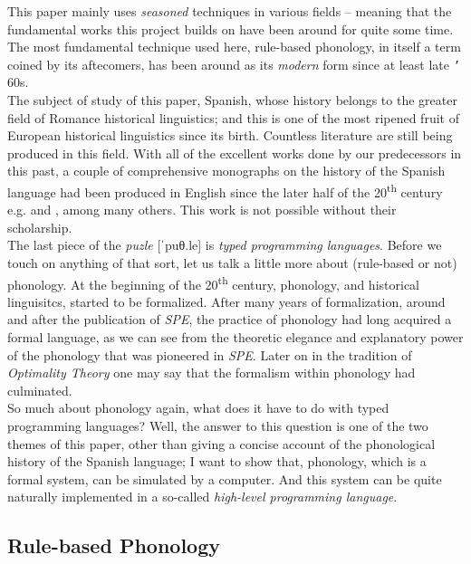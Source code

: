 \documentclass{report}[12pt]
\begin{document}
This paper mainly uses \emph{seasoned} techniques in various fields -- meaning that the fundamental works this project builds on have been around for quite some time. \\ The most fundamental technique used here, rule-based phonology, in itself a term coined by its aftecomers, has been around as its \emph{modern} form since at least late \texttt{'}\kern-1pt 60s. \\
The subject of study of this paper, Spanish, whose history belongs to the greater field of Romance historical linguistics; and this is one of the most ripened fruit of European historical linguistics since its birth. Countless literature are still being produced in this field. With all of the excellent works done by our predecessors in this past, a couple of comprehensive monographs on the history of the Spanish language had been produced in English since the later half of the 20\textsuperscript{th} century e.g. \cite{penny_spanish} and \cite{lloyd_spanish}, among many others. This work is not possible without their scholarship. \\
The last piece of the \emph{puzle} [ˈpuθ.le] is \emph{typed programming languages}. Before we touch on anything of that sort, let us talk a little more about (rule-based or not) phonology. At the beginning of the 20\textsuperscript{th} century, phonology, and historical linguisitcs, started to be formalized. After many years of formalization, around and after the publication of \emph{SPE}, the practice of phonology had long acquired a formal language, as we can see from the theoretic elegance and explanatory power of the phonology that was pioneered in \emph{SPE}. Later on in the tradition of \emph{Optimality Theory} \cite{prince_smol_ot} one may say that the formalism within phonology had culminated. \\
So much about phonology again, what does it have to do with typed programming languages? Well, the answer to this question is one of the two themes of this paper, other than giving a concise account of the phonological history of the Spanish language; I want to show that, phonology, which is a formal system, can be simulated by a computer. And this system can be quite naturally implemented in a so-called \emph{high-level programming language}.

\subsection*{Rule-based Phonology}
\end{document}
